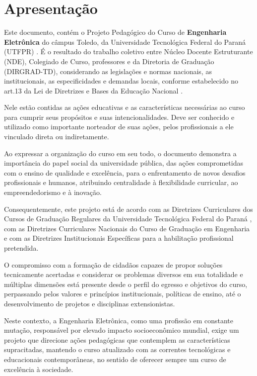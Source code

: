 \chapter*{Apresentação}

Este documento, contém o Projeto Pedagógico do Curso de \textbf{Engenharia Eletrônica}  do câmpus Toledo, da Universidade Tecnológica Federal do Paraná (UTFPR) \cite{abertura, reconhecimento, renova1, renova2, renova3}. É o resultado do trabalho coletivo entre Núcleo Docente Estruturante (NDE), Colegiado de Curso, professores e da Diretoria de Graduação (DIRGRAD-TD), considerando as legislações e normas nacionais, as institucionais, as especificidades e demandas locais, conforme estabelecido no art.13\textordmasculine{} da Lei de Diretrizes e Bases da Educação Nacional \cite{Lei:9394:1996}.

Nele estão contidas as ações educativas e as características necessárias ao curso para cumprir seus propósitos e suas intencionalidades. Deve ser conhecido e utilizado como importante norteador de suas ações, pelos profissionais a ele vinculado direta ou indiretamente.

Ao expressar a organização do curso em seu todo, o documento demonstra a importância do papel social da universidade pública, das ações comprometidas com o ensino de qualidade e excelência, para o enfrentamento de novos desafios profissionais e humanos, atribuindo centralidade à flexibilidade curricular, ao empreendedorismo e à inovação.

Consequentemente, este projeto está de acordo com as Diretrizes Curriculares dos Cursos de Graduação Regulares da Universidade Tecnológica Federal do Paraná \cite{cogep90}, com as Diretrizes Curriculares Nacionais do Curso de Graduação em Engenharia \cite{dcneng} e com as Diretrizes Institucionais Específicas para a habilitação profissional pretendida.

O compromisso com a formação de cidadãos capazes de propor soluções tecnicamente acertadas e considerar os problemas diversos em sua totalidade e múltiplas dimensões está presente desde o perfil do egresso e objetivos do curso, perpassando pelos valores e princípios institucionais, políticas de ensino, até o desenvolvimento de projetos e disciplinas extensionistas.

Neste contexto, a Engenharia Eletrônica, como uma profissão em constante mutação, responsável por elevado impacto socioeconômico mundial, exige um projeto que direcione ações pedagógicas que contemplem as características supracitadas, mantendo o curso atualizado com as correntes tecnológicas e educacionais contemporâneas, no sentido de oferecer sempre um curso de excelência à sociedade.